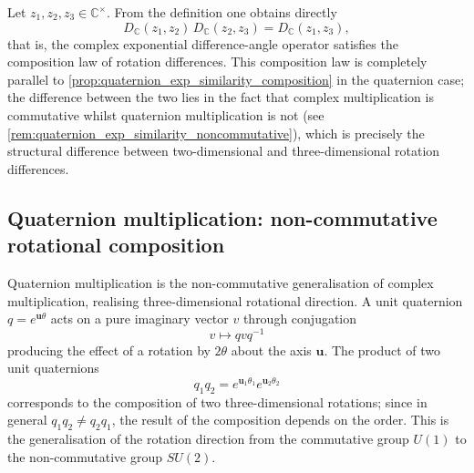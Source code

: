 \begin{remark}\label{rem:complex_exp_similarity_composition}
Let $z_1,z_2,z_3\in\mathbb C^\times$. From the definition one obtains directly
\[
D_{\mathbb C}(z_1,z_2)\,D_{\mathbb C}(z_2,z_3)=D_{\mathbb C}(z_1,z_3),
\]
that is, the complex exponential difference-angle operator satisfies the composition law of rotation differences. This composition law is completely parallel to \cref{prop:quaternion_exp_similarity_composition} in the quaternion case; the difference between the two lies in the fact that complex multiplication is commutative whilst quaternion multiplication is not (see \cref{rem:quaternion_exp_similarity_noncommutative}), which is precisely the structural difference between two-dimensional and three-dimensional rotation differences.
\end{remark}

\subsection{Quaternion multiplication: non-commutative rotational composition}

\begin{proposition}\label{prop:quaternion_multiplication}
Quaternion multiplication is the non-commutative generalisation of complex multiplication, realising three-dimensional rotational direction. A unit quaternion $q=e^{\mathbf u\theta}$ acts on a pure imaginary vector $v$ through conjugation
\[
v\longmapsto qvq^{-1}
\]
producing the effect of a rotation by $2\theta$ about the axis $\mathbf u$. The product of two unit quaternions
\[
q_1q_2=e^{\mathbf u_1\theta_1}e^{\mathbf u_2\theta_2}
\]
corresponds to the composition of two three-dimensional rotations; since in general $q_1q_2\neq q_2q_1$, the result of the composition depends on the order. This is the generalisation of the rotation direction from the commutative group $U(1)$ to the non-commutative group $SU(2)$.
\end{proposition}

